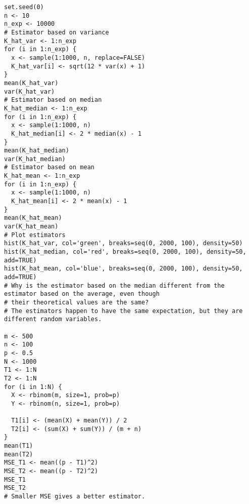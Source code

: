 \newpage

\begin{verbatim}set.seed(0)
n <- 10
n_exp <- 10000
# Estimator based on variance
K_hat_var <- 1:n_exp
for (i in 1:n_exp) {
  x <- sample(1:1000, n, replace=FALSE)
  K_hat_var[i] <- sqrt(12 * var(x) + 1)
}
mean(K_hat_var)
var(K_hat_var)
# Estimator based on median
K_hat_median <- 1:n_exp
for (i in 1:n_exp) {
  x <- sample(1:1000, n)
  K_hat_median[i] <- 2 * median(x) - 1
}
mean(K_hat_median)
var(K_hat_median)
# Estimator based on mean
K_hat_mean <- 1:n_exp
for (i in 1:n_exp) {
  x <- sample(1:1000, n)
  K_hat_mean[i] <- 2 * mean(x) - 1
}
mean(K_hat_mean)
var(K_hat_mean)
# Plot estimators
hist(K_hat_var, col='green', breaks=seq(0, 2000, 100), density=50)
hist(K_hat_median, col='red', breaks=seq(0, 2000, 100), density=50, add=TRUE)
hist(K_hat_mean, col='blue', breaks=seq(0, 2000, 100), density=50, add=TRUE)
# Why is the estimator based on the median different from the estimator based on the average, even though
# their theoretical values are the same?
# The estimators happen to have the same expectation, but they are different random variables.

m <- 500
n <- 100
p <- 0.5
N <- 1000
T1 <- 1:N
T2 <- 1:N
for (i in 1:N) {
  X <- rbinom(m, size=1, prob=p)
  Y <- rbinom(n, size=1, prob=p)

  T1[i] <- (mean(X) + mean(Y)) / 2
  T2[i] <- (sum(X) + sum(Y)) / (m + n)
}
mean(T1)
mean(T2)
MSE_T1 <- mean((p - T1)^2)
MSE_T2 <- mean((p - T2)^2)
MSE_T1
MSE_T2
# Smaller MSE gives a better estimator.

\end{verbatim}
